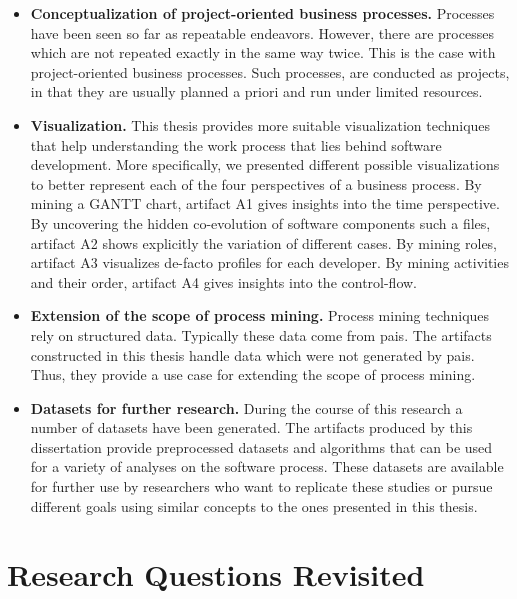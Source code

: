 \begin{itemize}
	
	\item \textbf{Conceptualization of project-oriented business processes.} Processes have been seen so far as repeatable endeavors. However, there are processes which are not repeated exactly in the same way twice. This is the case with project-oriented business processes. Such processes, are conducted as projects, in that they are usually planned a priori and run under limited resources. 
	
	\item \textbf{Visualization.} This thesis provides more suitable visualization techniques that help understanding the work process that lies behind software development. More specifically, we presented different possible visualizations to better represent each of the four perspectives of a business process. By mining a GANTT chart, artifact A1 gives insights into the time perspective. By uncovering the hidden co-evolution of software components such a files, artifact A2 shows explicitly the variation of different cases. By mining roles, artifact A3 visualizes de-facto profiles for each developer. By mining activities and their order, artifact A4 gives insights into the control-flow. 
	
	\item \textbf{Extension of the scope of process mining.} Process mining techniques rely on structured data. Typically these data come from \gls{pais}. The artifacts constructed in this thesis handle data which were not generated by \gls{pais}. Thus, they provide a use case for extending the scope of process mining. 
	
	\item \textbf{Datasets for further research.} During the course of this research a number of datasets have been generated. The artifacts produced by this dissertation provide preprocessed datasets and algorithms that can be used for a variety of analyses on the software process. These datasets are available for further use by researchers who want to replicate these studies or pursue different goals using similar concepts to the ones presented in this thesis. 
	
\end{itemize}


\section{Research Questions Revisited} 
\label{sec:8-discussion}

